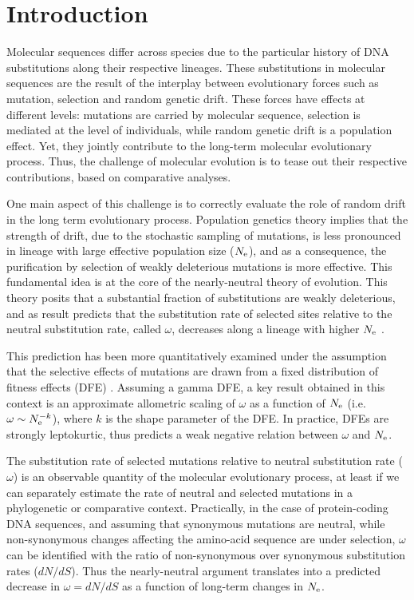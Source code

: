 \section{Introduction}
Molecular sequences differ across species due to the particular history of DNA substitutions along their respective lineages.
These substitutions in molecular sequences are the result of the interplay between evolutionary forces such as mutation, selection and random genetic drift.
These forces have effects at different levels: mutations are carried by molecular sequence, selection is mediated at the level of individuals, while random genetic drift is a population effect.
Yet, they jointly contribute to the long-term molecular evolutionary process.
Thus, the challenge of molecular evolution is to tease out their respective contributions, based on comparative analyses.

One main aspect of this challenge is to correctly evaluate the role of random drift in the long term evolutionary process.
Population genetics theory implies that the strength of drift, due to the stochastic sampling of mutations, is less pronounced in lineage with large effective population size ($N_{\mathrm{e}}$), and as a consequence, the purification by selection of weakly deleterious mutations is more effective.
This fundamental idea is at the core of the nearly-neutral theory of evolution.
This theory posits that a substantial fraction of substitutions are weakly deleterious, and as result predicts that the substitution rate of selected sites relative to the neutral substitution rate, called $\omega$, decreases along a lineage with higher $N_{\mathrm{e}}$ \citep{Ohta1972, Ohta1992}.

This prediction has been more quantitatively examined under the assumption that the selective effects of mutations are drawn from a fixed distribution of fitness effects (DFE) \citep{Kimura1979, Welch2008}.
Assuming a gamma DFE, a key result obtained in this context is an approximate allometric scaling of $\omega$ as a function of $N_{\mathrm{e}}$ (i.e. $\omega \sim N_{\mathrm{e}}^{-k}$), where $k$ is the shape parameter of the DFE.
In practice, DFEs are strongly leptokurtic, thus predicts a weak negative relation between $\omega$ and $N_{\mathrm{e}}$.

The substitution rate of selected mutations relative to neutral substitution rate ($\omega$) is an observable quantity of the molecular evolutionary process, at least if we can separately estimate the rate of neutral and selected mutations in a phylogenetic or comparative context.
Practically, in the case of protein-coding DNA sequences, and assuming that synonymous mutations are neutral, while non-synonymous changes affecting the amino-acid sequence are under selection, $\omega$ can be identified with the ratio of non-synonymous over synonymous substitution rates ($dN/dS$).
Thus the nearly-neutral argument translates into a predicted decrease in $\omega = dN/dS$ as a function of long-term changes in $N_{\mathrm{e}}$.

